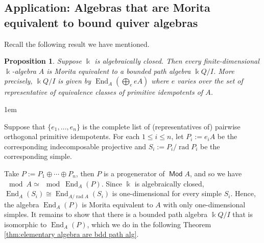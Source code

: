 \documentclass[11pt,a4paper]{article}
\makeatletter
\numberwithin{equation}{section}
\renewenvironment{proof}[1][\proofname]{\par
    \pushQED{\qed}%
    \normalfont \topsep0\p@\@plus6\p@ \labelsep1em\relax
    \trivlist
    \item[\hskip\labelsep\indent
        \bfseries #1]\ignorespaces
    \mbox{}
}{
    \popQED\endtrivlist\@endpefalse
}
\theoremstyle{all}
\newtheorem{proposition}[theorem]{Proposition}
\theoremstyle{remark}
\newcommand{\rad}{\operatorname{rad}\nolimits}
\newcommand{\End}{\operatorname{End}\nolimits}
\DeclareMathOperator{\Mod}{\mathsf{Mod}}
\makeatother
\begin{document}
\subsection{Application: Algebras that are Morita equivalent to bound quiver algebras}

Recall the following result we have mentioned.

\begin{proposition}
Suppose $\Bbbk$ is algebraically closed.
Then every finite-dimensional $\Bbbk$-algebra $A$ is Morita equivalent to a bounded path algebra $\Bbbk Q/I$.
More precisely, $\Bbbk Q/I$ is given by $\End_A(\bigoplus_{e} eA)$ where $e$ varies over the set of representative of equivalence classes of primitive idempotents of $A$.
\end{proposition}
\begin{proof}
Suppose that $\{e_1,\ldots, e_n\}$ is the complete list of (representatives of) pairwise orthogonal primitive idempotents. 
For each $1\le i\le n$, let $P_i:=e_iA$ be the corresponding indecomposable projective and $S_i:=P_i/\rad P_i$ be the corresponding simple.  

Take $P:=P_1\oplus \cdots \oplus P_n$, then $P$ is a progenerator of $\Mod A$, and so we have $\mod A\simeq \mod \End_A(P)$.
Since $\Bbbk$ is algebraically closed, $\End_A(S_i) \cong \End_{A/\rad A}(S_i)$ is one-dimensional for every simple $S_i$.
Hence, the algebra $\End_A(P)$ is Morita equivalent to $A$ with only one-dimensional simples.  
It remains to show that there is a bounded path algebra $\Bbbk Q/I$ that is isomorphic to $\End_A(P)$, which we do in the following Theorem \ref{thm:elementary algebra are bdd path alg}.
\end{proof}
\end{document}
